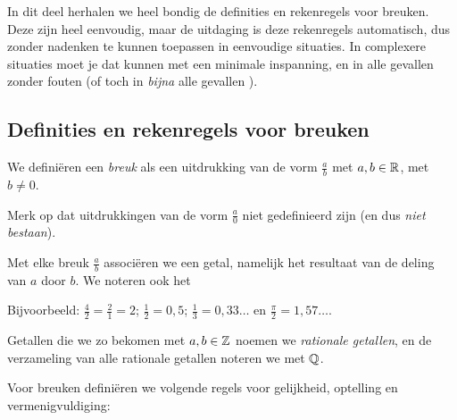 \documentclass{ximera}
\begin{document}
\author{Zomercursus KU Leuven}


In dit deel herhalen we heel bondig de definities en rekenregels voor breuken. 
Deze zijn heel eenvoudig, maar de uitdaging is deze rekenregels automatisch, dus zonder nadenken te kunnen toepassen in eenvoudige situaties. 
In complexere situaties moet je dat kunnen met een minimale inspanning, en in alle gevallen zonder fouten (of toch in \textit{bijna} alle gevallen \Smiley).

\subsection{Definities en rekenregels voor breuken}
We definiëren een \textit{breuk} als een uitdrukking van de vorm $\frac{a}{b}$ met $a,b\in\mathbb{R}$, met $b\neq0$. 


Merk op dat uitdrukkingen van de vorm $\frac a0$ niet gedefinieerd zijn (en dus \textit{niet bestaan}).  

Met elke breuk $\frac ab$ associëren we een getal, namelijk het resultaat van de deling van $a$ door $b$. We noteren ook het 

Bijvoorbeeld: $\frac42=\frac21=2$; \quad $\frac12=0,5$; \quad $\frac13=0,33\dots$ en $\frac{\pi}{2}=1,57\dots$. 

Getallen die we zo bekomen met $a,b\in\mathbb{Z}$ noemen we \textit{rationale getallen}, en de verzameling van alle rationale getallen noteren we met $\mathbb{Q}$.


Voor breuken definiëren we volgende regels voor gelijkheid, optelling en vermenigvuldiging: 
\end{document}
